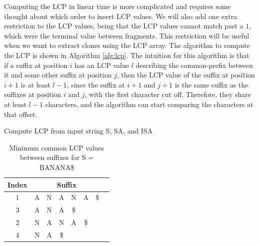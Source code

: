 Computing the LCP in linear time is more complicated and requires some thought about which
order to insert LCP values. We will also add one extra restriction to the LCP values,
being that the LCP values cannot match past a $1$, which were the terminal value between
fragments. This restriction will be useful when we want to extract clones using the LCP
array. The algorithm to compute the LCP is shown in Algorithm \ref{alg:lcp}. The intuition
for this algorithm is that if a suffix at position $i$ has an LCP value $l$ describing the
common-prefix between it and some other suffix at position $j$, then the LCP value of the
suffix at position $i + 1$ is at least $l - 1$, since the suffix at $i + 1$ and $j + 1$ is
the same suffix as the suffixes at position $i$ and $j$, with the first character cut off.
Therefore, they share at least $l - 1$ characters, and the algorithm can start comparing
the characters at that offset.

\begin{algorithm}[htp]
  \SetAlgoLined\DontPrintSemicolon

  \vspace{0.5cm}
  \caption{Compute LCP from input string S, SA, and ISA}
  \label{alg:lcp}
\end{algorithm}

\begin{table}
    \begin{center}
        \begin{tabular}[c]{c|ccccccc}
            Index & \multicolumn{6}{c}{Suffix} \\
            \hline
            1 & A & N & A & N & A & \$ \\ 
            3 & A & N & A & \$ \\ 
            2 & N & A & N & A & \$ \\ 
            4 & N & A & \$ \\ 

        \end{tabular}
    \end{center}
    \caption{Minimum common LCP values between suffixes for S = BANANA\$}
    \label{tab:}
\end{table}



